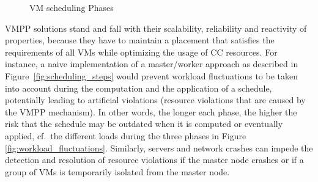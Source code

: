 \begin{figure}[ht]
\vspace*{-.2cm}
\begin{center}
        \subcapcentertrue
\vspace*{-.2cm}
\caption{VM scheduling Phases}
\end{center}
\label{fig:scheduling}
\vspace*{-.2cm}
\end{figure}
%

VMPP solutions stand and fall with their scalability, reliability and
reactivity of properties, because they have to maintain a placement
that satisfies the requirements of all VMs while optimizing the usage
of CC resources. For instance, a naive implementation of a
master/worker approach as described in
Figure~\ref{fig:scheduling_steps} would prevent workload fluctuations
to be taken into account during the computation and the application of
a schedule, potentially leading to artificial violations (\ie resource
violations that are caused by the VMPP mechanism). In other words, the
longer each phase,
the higher the risk that the schedule may be outdated when it is
computed or eventually applied, cf.\ the different loads during the
three phases in Figure \ref{fig:workload_fluctuations}. Similarly,
servers and network crashes can impede the detection and resolution of
resource violations if the master node crashes or if a group of VMs is
temporarily isolated from the master node.

